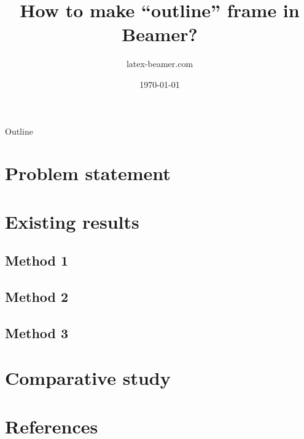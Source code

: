 
\title{How to make “outline” frame in Beamer?} 
\author{latex-beamer.com}
\date{\today}

\begin{frame}
    \titlepage 
\end{frame}

\begin{frame}{Outline}
    \tableofcontents
\end{frame}


\section{Problem statement}
\section{Existing results}
    \subsection{Method 1}
    \subsection{Method 2}
    \subsection{Method 3}
\section{Comparative study}
\section*{References}

\begin{frame}
\end{frame}
 
